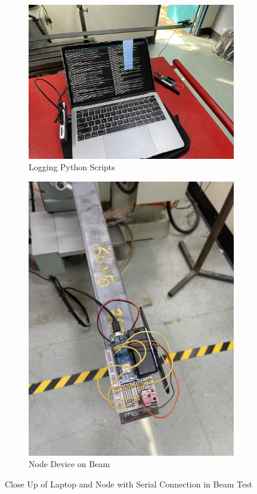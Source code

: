 \begin{figure}[H]
	\centering
	\begin{subfigure}{.5\textwidth}
		\centering 
		\includegraphics[scale=0.15]{Sections/Prototype-Testing/laptop-beam-test.jpg}
		\caption{Logging Python Scripts}
		\label{laptop-beam-test}
	\end{subfigure}%
	\begin{subfigure}{.25\textwidth}
		\centering
		\includegraphics[scale=0.1]{Sections/Prototype-Testing/node-beam-test.jpg}
		\caption{Node Device on Beam}
		\label{node-beam-test}
	\end{subfigure}
	\caption{Close Up of Laptop and Node with Serial Connection in Beam Test}
	\label{close-beam-test}
\end{figure}

